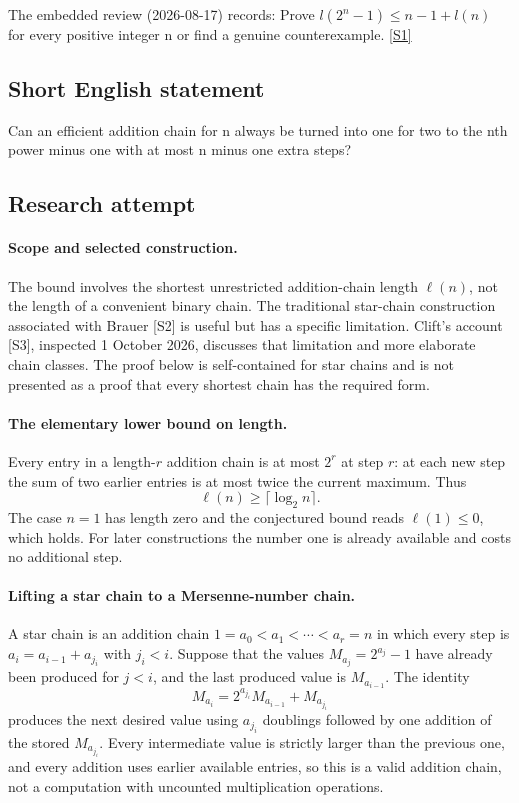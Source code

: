 \documentclass[11pt,a4paper]{article}
\newcommand{\sref}[2]{\hyperlink{source:#1:#2}{[S#2]}}
\begin{document}
The embedded review (2026-08-17) records: Prove $l(2^n-1)\leq n-1+l(n)$ for every positive integer n or find a genuine counterexample. \sref{statement}{1}

\subsection{Short English statement}

Can an efficient addition chain for n always be turned into one for two to the nth power minus one with at most n minus one extra steps?

\subsection{Research attempt}

\paragraph{Scope and selected construction.}
The bound involves the shortest unrestricted addition-chain length
$\ell(n)$, not the length of a convenient binary chain. The traditional
star-chain construction associated with Brauer [S2] is useful but has a
specific limitation. Clift's account [S3], inspected 1 October 2026,
discusses that limitation and more elaborate chain classes. The proof
below is self-contained for star chains and is not presented as a proof
that every shortest chain has the required form.

\paragraph{The elementary lower bound on length.}
Every entry in a length-$r$ addition chain is at most $2^r$ at step $r$:
at each new step the sum of two earlier entries is at most twice the
current maximum. Thus
\[
                      \ell(n)\ge\lceil\log_2n\rceil.
\]
The case $n=1$ has length zero and the conjectured bound reads
$\ell(1)\le0$, which holds. For later constructions the number one is
already available and costs no additional step.

\paragraph{Lifting a star chain to a Mersenne-number chain.}
A star chain is an addition chain
$1=a_0<a_1<\cdots<a_r=n$ in which every step is
$a_i=a_{i-1}+a_{j_i}$ with $j_i<i$. Suppose that the values
$M_{a_j}=2^{a_j}-1$ have already been produced for $j<i$, and the
last produced value is $M_{a_{i-1}}$. The identity
\[
 M_{a_i}=2^{a_{j_i}}M_{a_{i-1}}+M_{a_{j_i}}
\]
produces the next desired value using $a_{j_i}$ doublings followed by
one addition of the stored $M_{a_{j_i}}$. Every intermediate value is
strictly larger than the previous one, and every addition uses earlier
available entries, so this is a valid addition chain, not a computation
with uncounted multiplication operations.
\end{document}
